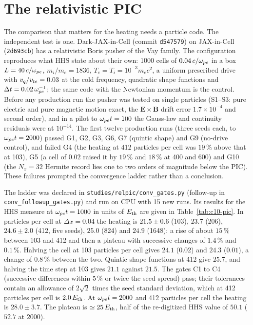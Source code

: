 \section{The relativistic PIC}\label{sec:c10-pic}


The comparison that matters for the heating needs a particle code. The independent test is one. Dark-JAX-in-Cell (commit \texttt{d547579}) on JAX-in-Cell (\texttt{2d693cb}) has a relativistic Boris pusher of the Vay family. The configuration reproduces what HHS state about their own: 1000 cells of $0.04\,c/\omega_{pe}$ in a box $L=40\,c/\omega_{pe}$, $m_i/m_e=1836$, $T_e=T_i=10^{-3}m_ec^2$, a uniform prescribed drive with $v_q/v_{te}=0.03$ at the cold frequency, quadratic shape functions and $\Delta t=0.02\,\omega_{pe}^{-1}$; the same code with the Newtonian momentum is the control. Before any production run the pusher was tested on single particles (S1--S3: pure electric and pure magnetic motion exact, the $\mathbf E\times\mathbf B$ drift error $1.7\times10^{-4}$ and second order), and in a pilot to $\omega_{pe} t=100$ the Gauss-law and continuity residuals were at $10^{-14}$. The first twelve production runs (three seeds each, to $\omega_{pe} t=2000$) passed G1, G2, G3, G6, G7 (quintic shape) and G9 (no-drive control), and failed G4 (the heating at 412 particles per cell was $19\,\%$ above that at 103), G5 (a cell of $0.02$ raised it by $19\,\%$ and $18\,\%$ at 400 and 600) and G10 (the $N_x=32$ Hermite record lies one to two orders of magnitude below the PIC). These failures prompted the convergence ladder rather than a conclusion.


The ladder was declared in \texttt{studies/relpic/conv\_gates.py} (follow-up in \texttt{conv\_followup\_gates.py}) and run on CPU with 15 new runs. Its results for the HHS measure at $\omega_{pe} t=1000$ in units of $E_{\rm th}$ are given in Table~\ref{tab:c10-pic}. In particles per cell at $\Delta x=0.04$ the heating is $21.5\pm0.6$ (103), $23.7$ (206), $24.6\pm2.0$ (412, five seeds), $25.0$ (824) and $24.9$ (1648): a rise of about $15\,\%$ between 103 and 412 and then a plateau with successive changes of $1.4\,\%$ and $0.1\,\%$. Halving the cell at 103 particles per cell gives $24.1$ ($0.02$) and $24.3$ ($0.01$), a change of $0.8\,\%$ between the two. Quintic shape functions at 412 give $25.7$, and halving the time step at 103 gives $21.1$ against $21.5$. The gates C1 to C4 (successive differences within $5\,\%$ or twice the seed spread) pass; their tolerances contain an allowance of $2\sqrt2$ times the seed standard deviation, which at 412 particles per cell is $2.0\,E_{\rm th}$. At $\omega_{pe} t=2000$ and 412 particles per cell the heating is $28.0\pm3.7$. The plateau is $\simeq25\,E_{\rm th}$, half of the re-digitized HHS value of $50.1$ ($52.7$ at $2000$).

